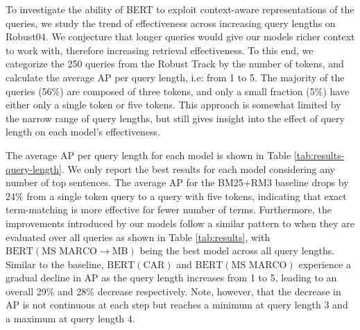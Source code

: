 \begin{table*}[b!]
\centering{}
\caption{Average AP with respect to query length on Robust04.}
\label{tab:results-query-length}
\end{table*}

To investigate the ability of BERT to exploit context-aware representations of the queries, we study the trend of effectiveness across increasing query lengths on Robust04.
We conjecture that longer queries would give our models richer context to work with, therefore increasing retrieval effectiveness.
To this end, we categorize the 250 queries from the Robust Track by the number of tokens, and calculate the average AP per query length, i.e: from 1 to 5.
The majority of the queries (56\%) are composed of three tokens, and only a small fraction (5\%) have either only a single token or five tokens.
This approach is somewhat limited by the narrow range of query lengths, but still gives insight into the effect of query length on each model's effectiveness.

The average AP per query length for each model is shown in Table \ref{tab:results-query-length}.
We only report the best results for each model considering any number of top sentences.
The average AP for the BM25+RM3 baseline drops by 24\% from a single token query to a query with five tokens, indicating that exact term-matching is more effective for fewer number of terms.
Furthermore, the improvements introduced by our models follow a similar pattern to when they are evaluated over all queries as shown in Table \ref{tab:results}, with $ \textrm{BERT}(\textrm{MS MARCO}\rightarrow\textrm{MB}) $ being the best model across all query lengths.
Similar to the baseline, $ \textrm{BERT}(\textrm{CAR}) $ and $ \textrm{BERT}(\textrm{MS MARCO}) $ experience a gradual decline in AP as the query length increases from 1 to 5, leading to an overall 29\% and 28\% decrease respectively.
Note, however, that the decrease in AP is not continuous at each step but reaches a minimum at query length 3 and a maximum at query length 4.

